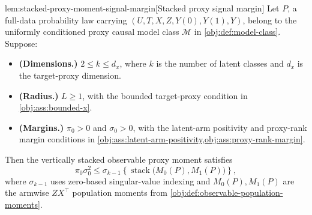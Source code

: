 \documentclass[11pt]{article}
\begin{document}
\begin{lemmav}{lem:stacked-proxy-moment-signal-margin}[Stacked proxy signal margin]
Let \(P\), a full-data probability law carrying \((U,T,X,Z,Y(0),Y(1),Y)\), belong to the uniformly conditioned proxy causal model class \(\mathcal M\) in \cref{obj:def:model-class}. Suppose:
\begin{itemize}
\item \textbf{(Dimensions.)} \(2\le k\le d_x\), where \(k\) is the number of latent classes and \(d_x\) is the target-proxy dimension.
\item \textbf{(Radius.)} \(L\ge 1\), with the bounded target-proxy condition in \cref{obj:ass:bounded-x}.
\item \textbf{(Margins.)} \(\pi_0>0\) and \(\sigma_0>0\), with the latent-arm positivity and proxy-rank margin conditions in \cref{obj:ass:latent-arm-positivity,obj:ass:proxy-rank-margin}.
\end{itemize}
Then the vertically stacked observable proxy moment satisfies
\[
\pi_0\sigma_0^2
\le
\sigma_{k-1}\!\left\{\operatorname{stack}\bigl(M_0(P),M_1(P)\bigr)\right\},
\]
where \(\sigma_{k-1}\) uses zero-based singular-value indexing and \(M_0(P),M_1(P)\) are the armwise \(ZX^\top\) population moments from \cref{obj:def:observable-population-moments}.
\end{lemmav}
\end{document}
